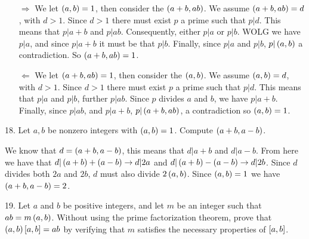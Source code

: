 \begin{mdframed}[style=darkAnswer,frametitle={Joe Starr}]
\begin{itemize}[align=left]
    \item [$\Rightarrow$]{
    We let $\left(a,b\right)=1$, then consider the $\left(a+b,ab\right)$. We assume 
    $\left(a+b,ab\right)=d$, with $d>1$. Since $d>1$ there must exist $p$ a prime such that
    $p\vert d$. This means that $p\vert a+b$ and $p \vert ab$. Consequently, either
    $p\vert a$ or $p\vert b$. WOLG we have $p\vert a$, and since $p\vert a+b$ it 
    must be that $p\vert b$. Finally, since $p\vert a $ and $p\vert b$, 
    $p\vert \left(a,b\right)$ a contradiction. So $\left(a+b,ab\right)=1$.
    }
    \item [$\Leftarrow$]{
    We let $\left(a+b,ab\right)=1$, then consider the $\left(a,b\right)$. We assume 
    $\left(a,b\right)=d$, with $d>1$. Since $d>1$ there must exist $p$ a prime such that
    $p\vert d$. This means that $p\vert a$ and $p\vert b$, further $p \vert ab$. 
    Since $p$ divides $a$ and $b$, we have $p\vert a+b$. Finally, since $p\vert ab$, 
    and $p\vert a+b$, $p\vert \left(a+b,ab\right)$, a contradiction so $\left(a,b\right)=1$.
    }
\end{itemize}
\end{mdframed}
\newpage
\begin{mdframed}[style=darkQuesion]
18. Let $a,b$ be nonzero integers with $\left(a,b\right)=1$. Compute $\left(a+b,a-b\right)$. 
\end{mdframed}

\begin{mdframed}[style=darkAnswer,frametitle={Joe Starr}]
We know that $d=\left(a+b,a-b\right)$, this means that $d\vert a+b$ and $d\vert a-b$. 
From here we have that $d\vert \left(a+b\right)+\left(a-b\right) \rightarrow d\vert 2a$ and 
$d\vert \left(a+b\right)-\left(a-b\right) \rightarrow d\vert 2b$. Since $d$ divides both $2a$
and $2b$, $d$ must also divide $2\left(a,b\right)$. Since $\left(a,b\right)=1$ we have 
$\left(a+b,a-b\right)=2$.
\end{mdframed}
\newpage
\begin{mdframed}[style=darkQuesion]
19. Let $a$ and $b$ be positive integers, and let $m$ be an integer such that 
$ab=m\left(a,b\right)$. Without using the prime factorization theorem, prove that 
$\left(a,b\right)\left[a,b\right]=ab$ by verifying that $m$ satisfies the necessary properties
of $\left[a,b\right]$.
\end{mdframed}

